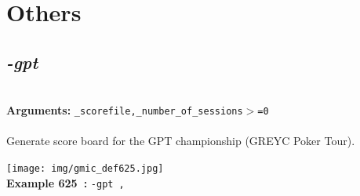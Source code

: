 \documentclass[a4paper,11pt,twoside]{book}
\begin{document}
\section{Others}


\subsection{\emph{-gpt} }\vspace*{-0.5em}
~\\\textbf{Arguments: } 
{\small \texttt{\_scorefile,\_number\_of\_sessions$>$=0}}\\~\\
Generate score board for the GPT championship (GREYC Poker Tour).
\begin{center}\texttt{[image: img/gmic\_def625.jpg]}\\
{\footnotesize \textbf{Example 625~:} \texttt{-gpt ,}}
\end{center}
\end{document}
